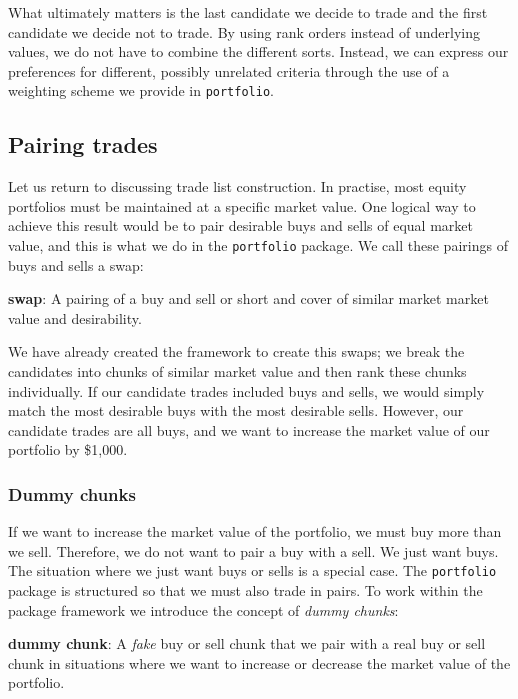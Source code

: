 \documentclass{article}
\begin{document}
What ultimately matters is the last candidate we decide to trade and
the first candidate we decide not to trade.  By using rank orders
instead of underlying values, we do not have to combine the different
sorts.  Instead, we can express our preferences for different,
possibly unrelated criteria through the use of a weighting scheme we
provide in \texttt{portfolio}.  

\subsection{Pairing trades}

Let us return to discussing trade list construction.  In practise,
most equity portfolios must be maintained at a specific market value.
One logical way to achieve this result would be to pair desirable buys
and sells of equal market value, and this is what we do in the
\texttt{portfolio} package.  We call these pairings of buys and sells
a swap:

\begin{description}

  \item{\bf{swap}}: A pairing of a buy and sell or short and cover of
  similar market market value and desirability.

\end{description}

We have already created the framework to create this swaps; we break
the candidates into chunks of similar market value and then rank these
chunks individually.  If our candidate trades included buys and sells,
we would simply match the most desirable buys with the most desirable
sells.  However, our candidate trades are all buys, and we want to
increase the market value of our portfolio by \$1,000.

\subsubsection{Dummy chunks}

If we want to increase the market value of the portfolio, we must buy
more than we sell.  Therefore, we do not want to pair a buy with a
sell.  We just want buys.  The situation where we just want buys or
sells is a special case.  The \texttt{portfolio} package is structured
so that we must also trade in pairs.  To work within the package
framework we introduce the concept of \emph{dummy chunks}:

\begin{description}

  \item{\bf{dummy chunk}}: A \emph{fake} buy or sell chunk that we pair with
  a real buy or sell chunk in situations where we want to increase or
  decrease the market value of the portfolio.

\end{description}
\end{document}
